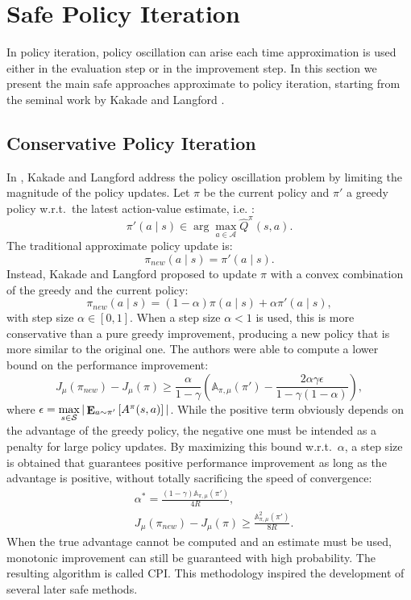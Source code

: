 \section{Safe Policy Iteration}\label{sec:spi}
In policy iteration, policy oscillation can arise each time approximation is used either in the evaluation step or in the improvement step.
In this section we present the main safe approaches approximate to policy iteration, starting from the seminal work by Kakade and Langford \cite{kakade2002approximately}.

\subsection{Conservative Policy Iteration}\label{sec:CPI}
In \cite{kakade2002approximately}, Kakade and Langford address the policy oscillation problem by limiting the magnitude of the policy updates.
Let $\pi$ be the current policy and $\pi'$ a greedy policy w.r.t.\ the latest action-value estimate, i.e. :
\[
	\pi'(a \mid s) \in \arg\max\limits_{a \in \mathcal{A}} \hat{Q}^{\pi}(s,a).
\]
The traditional approximate policy update is:
\[
	\pi_{new}(a \mid s) = \pi'(a \mid s).
\]
Instead, Kakade and Langford proposed to update $\pi$ with a convex combination of the greedy and the current policy:
\begin{equation} \label{eq:cpi}
	\pi_{new}(a \mid s) = (1-\alpha)\pi(a \mid s) + \alpha\pi'(a \mid s),
\end{equation}
with step size $\alpha \in [0,1]$. When a step size $\alpha<1$ is used, this is more conservative than a pure greedy improvement, producing a new policy that is more similar to the original one. 
The authors were able to compute a lower bound on the performance improvement:
\[
	J_\mu(\pi_{new}) - J_\mu(\pi) \geq \frac{\alpha}{1-\gamma}\left(\mathbb{A}_{\pi,\mu}(\pi')
		- \frac{2\alpha\gamma\epsilon}{1-\gamma(1-\alpha)}\right),
\]
where $\epsilon = \max\limits_{s \in \mathcal{S}}|\mathop{\mathbf{E}}_{a\sim{\pi'}}\left[A^\pi(s,a)\right]|$. While the positive term obviously depends on the advantage of the greedy policy, the negative one must be intended as a penalty for large policy updates. By maximizing this bound w.r.t.\ $\alpha$, a step size is obtained that guarantees positive performance improvement as long as the advantage is positive, without totally sacrificing the speed of convergence:
\begin{align}
&\alpha^* = \frac{(1-\gamma)\mathbb{A}_{\pi,\mu}(\pi')}{4R}, \\
& J_\mu(\pi_{new}) - J_\mu(\pi) \geq \frac{\mathbb{A}^2_{\pi,\mu}(\pi')}{8R}.
\end{align}
When the true advantage cannot be computed and an estimate must be used, monotonic improvement can still be guaranteed with high probability. The resulting algorithm is called \ac{CPI}.
This methodology inspired the development of several later safe methods.

